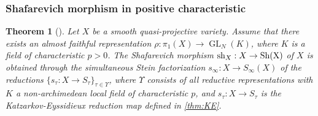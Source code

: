 \documentclass[english]{amsproc}
\theoremstyle{plain}
\newtheorem{thm}{Theorem}[section]
\theoremstyle{definition}
\theoremstyle{remark}
\theoremstyle{plain}
\numberwithin{equation}{thm} %
\begin{document}
\subsubsection{Shafarevich morphism in positive characteristic}
\begin{thm}[{\cite[Theorem 3.9]{DY23b}}]\label{thm:Shapositive} 
	Let $X$ be a smooth quasi-projective variety. Assume that there exists an almost faithful representation $\rho \colon \pi_1(X) \to \operatorname{GL}_{N}(K)$, where $K$ is a field of   characteristic $p>0$.	The Shafarevich morphism ${\rm sh}_X:X\to {\rm Sh(X)}$ of $X$  is obtained through the simultaneous Stein factorization $s_\infty:X\to S_\infty(X)$  of the reductions   $\{s_{\tau}:X\to S_\tau\}_{\tau\in \Upsilon}$,  where
	$\Upsilon$ consists of all reductive representations with $K$  a non-archimedean local field of characteristic $p$,  and $s_\tau:X\to S_\tau$ is the Katzarkov-Eyssidieux reduction map  defined in \cref{thm:KE}.  
\end{thm} 
\end{document}
